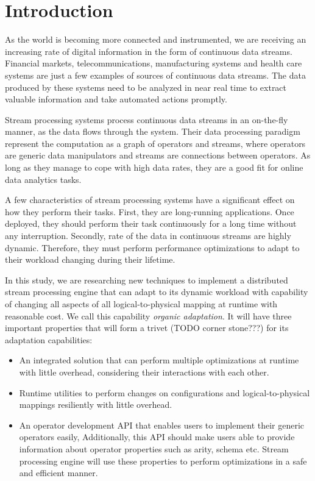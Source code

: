 \section{Introduction}\label{sec:introduction}

As the world is becoming more connected and instrumented, we are receiving an increasing rate of digital information in the form of continuous data streams. Financial markets, telecommunications, manufacturing systems and health care systems are just a few examples of sources of continuous data streams. The data produced by these systems need to be analyzed in near real time to extract valuable information and take automated actions promptly. 

Stream processing systems process continuous data streams in an on-the-fly manner, as the data flows through the system. Their data processing paradigm represent the computation as a graph of operators and streams, where operators are generic data manipulators and streams are connections between operators. As long as they manage to cope with high data rates, they are a good fit for online data analytics tasks. 

A few characteristics of stream processing systems have a significant effect on how they perform their tasks. First, they are long-running applications. Once deployed, they should perform their task continuously for a long time without any interruption. Secondly, rate of the data in continuous streams are highly dynamic. Therefore, they must perform performance optimizations to adapt to their workload changing during their lifetime. 

In this study, we are researching new techniques to implement a distributed stream processing engine that can adapt to its dynamic workload with capability of changing all aspects of all logical-to-physical mapping at runtime with reasonable cost. We call this capability \textit{organic adaptation}. It will have three important properties that will form a trivet (TODO corner stone???) for its adaptation capabilities:
\begin{itemize}
\item An integrated solution that can perform multiple optimizations at runtime with little overhead, considering their interactions with each other.
\item Runtime utilities to perform changes on configurations and logical-to-physical mappings resiliently with little overhead.
\item An operator development API that enables users to implement their generic operators easily, Additionally, this API should make users able to provide information about operator properties such as arity, schema etc. Stream processing engine will use these properties to perform optimizations in a safe and efficient manner.

\end{itemize}

